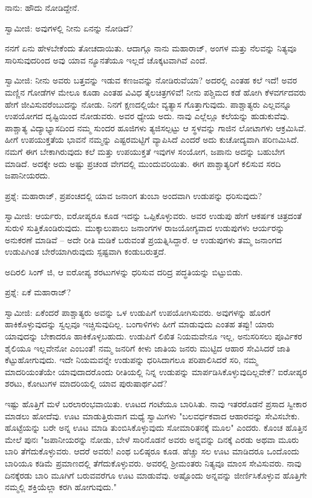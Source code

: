 ನಾನು: ಹೌದು ನೋಡಿದ್ದೇನೆ.

ಸ್ವಾಮೀಜಿ: ಅವುಗಳಲ್ಲಿ ನೀನು ಏನನ್ನು ನೋಡಿದೆ?

ನನಗೆ ಏನು ಹೇಳಬೇಕೆಂದು ತೋಚದಾಯಿತು. ಆದಾಗ್ಗೂ ನಾನು ಮಹಾರಾಜ್, ಅಂಗಳ ಮತ್ತು ನೆಲವನ್ನು ನಿತ್ಯವೂ ಸಾರಿಸುವುದರಿಂದ ಅವು ಯಾವ ನ್ಯೂನತೆಯೂ ಇಲ್ಲದೆ ಚೊಕ್ಕಟವಾಗಿವೆ ಎಂದೆ.

ಸ್ವಾಮೀಜಿ: ನೀನು ಅವರು ಬತ್ತವನ್ನು ಇಡುವ ಕಣಜವನ್ನು ನೋಡಿರುವೆಯಾ? ಅದರಲ್ಲಿ ಎಂತಹ ಕಲೆ ಇದೆ! ಅವರ ಮಣ್ಣಿನ ಗೋಡೆಗಳ ಮೇಲೂ ಕೂಡಾ ಎಂತಹ ವಿವಿಧ ತೈಲಚಿತ್ರಗಳಿವೆ! ನೀನು ಪಶ್ಚಿಮದ ಕಡೆ ಹೋಗಿ ಕೆಳವರ್ಗದವರು ಹೇಗೆ ಜೀವಿಸುವರೆಂಬುದನ್ನು ನೋಡು. ನಿನಗೆ ಕ್ಷಣದಲ್ಲಿಯೇ ವ್ಯತ್ಯಾಸ ಗೊತ್ತಾಗುವುದು. ಪಾಶ್ಚಾತ್ಯರು ಎಲ್ಲವನ್ನೂ ಉಪಯೋಗದ ದೃಷ್ಟಿಯಿಂದ ನೋಡುವರು. ಅವರ ಧ್ಯೇಯ ಅದು. ನಾವು ಎಲ್ಲೆಲ್ಲೂ ಕಲೆಯನ್ನು ಹುಡುಕುವೆವು. ಪಾಶ್ಚಾತ್ಯ ವಿದ್ಯಾಭ್ಯಾಸದಿಂದ ನಮ್ಮ ಸುಂದರ ಹೂಜಿಗಳು ತ್ಯಜಿಸಲ್ಪಟ್ಟು ಆ ಸ್ಥಳವನ್ನು ಗಾಜಿನ ಲೋಟಾಗಳು ಆಕ್ರಮಿಸಿವೆ. ಹೀಗೆ ಉಪಯುಕ್ತತೆಯ ಭಾವನೆ ನಮ್ಮನ್ನು ಎಷ್ಟರಮಟ್ಟಿಗೆ ವ್ಯಾಪಿಸಿದೆ ಎಂದರೆ ಅದು ಕುಚೋದ್ಯವಾಗಿ ಪರಿಣಮಿಸಿದೆ. ನಮಗೆ ಈಗ ಬೇಕಾಗಿರುವುದು ಕಲೆ ಮತ್ತು ಉಪಯುಕ್ತತೆ ಇವುಗಳ ಸಂಯೋಗ, ಜಪಾನು ಅದನ್ನು ಬಹುಬೇಗ ಮಾಡಿದೆ. ಅದಕ್ಕೇ ಅದು ಅಷ್ಟು ಪ್ರಚಂಡ ವೇಗದಲ್ಲಿ ಮುಂದುವರಿಯಿತು. ಈಗ ಪಾಶ್ಚಾತ್ಯರಿಗೆ ಕಲಿಸುವ ಸರದಿ ಜಪಾನೀಯರದು.

ಪ್ರಶ್ನೆ: ಮಹಾರಾಜ್, ಪ್ರಪಂಚದಲ್ಲಿ ಯಾವ ಜನಾಂಗ ತುಂಬಾ ಅಂದವಾಗಿ ಉಡುಪನ್ನು ಧರಿಸುವುದು?

ಸ್ವಾಮೀಜಿ: ಆರ್ಯರು, ಐರೋಪ್ಯರೂ ಕೂಡ ಇದನ್ನು ಒಪ್ಪಿಕೊಳ್ಳುವರು. ಅವರ ಉಡುಪು ಹೇಗೆ ಆಕರ್ಷಕ ಚಿತ್ರದಂತೆ ಸುರುಳಿ ಸುತ್ತಿಕೊಂಡಿರುವುದು. ಮುಕ್ಕಾಲುಪಾಲು ಜನಾಂಗಗಳ ರಾಜಯೋಗ್ಯವಾದ ಉಡುಪುಗಳು ಆರ್ಯರನ್ನು ಅನುಕರಣೆ ಮಾಡಿವೆ – ಅದೇ ರೀತಿ ಮಡಿಕೆ ಬರುವಂತೆ ಪ್ರಯತ್ನಿಸಿದ್ದಾರೆ. ಆ ಉಡುಪುಗಳು ತಮ್ಮ ಜನಾಂಗದ ಉಡುಪಿಗಿಂತ ಬೇರೆಯಾಗಿರುವುದು ಸ್ಪಷ್ಟವಾಗಿ ಕಂಡುಬರುತ್ತದೆ.

ಅದಿರಲಿ ಸಿಂಗ್ ಜಿ, ಆ ಐರೋಪ್ಯ ಶರಟುಗಳನ್ನು ಧರಿಸುವ ದರಿದ್ರ ಪದ್ಧತಿಯನ್ನು ಬಿಟ್ಟುಬಿಡು.

ಪ್ರಶ್ನೆ: ಏಕೆ ಮಹಾರಾಜ್?

ಸ್ವಾಮೀಜಿ: ಏಕೆಂದರೆ ಪಾಶ್ಚಾತ್ಯರು ಅವನ್ನು ಒಳ ಉಡುಪಿಗೆ ಉಪಯೋಗಿಸುವರು. ಅವುಗಳನ್ನು ಹೊರಗೆ ಹಾಕಿಕೊಳ್ಳುವುದನ್ನು ಸ್ವಲ್ಪವೂ ಇಚ್ಚಿಸುವುದಿಲ್ಲ. ಬಂಗಾಳಿಗಳು ಹೀಗೆ ಮಾಡುವುದು ಎಂತಹ ತಪ್ಪು! ಯಾರು ಯಾವುದನ್ನು ಬೇಕಾದರೂ ಹಾಕಿಕೊಳ್ಳಬಹುದು. ಉಡುಪಿಗೆ ಲಿಖಿತ ನಿಯಮವೇನೂ ಇಲ್ಲ, ಅನುಸರಿಸಲು ಪೂರ್ವಿಕರ ಶೈಲಿಯೂ ಇಲ್ಲವೇನೋ ಎಂಬಂತೆ! ನಮ್ಮ ಜನರಿಗೆ ಕೀಳು ಜಾತಿಯ ಜನರು ಮುಟ್ಟಿದ ಆಹಾರ ಸೇವಿಸಿದರೆ ಜಾತಿ ಕೆಟ್ಟುಹೋಗುವುದು. ಇದೇ ನಿಯಮವನ್ನೇ ಉಡುಪನ್ನು ಧರಿಸಿದಾಗಲೂ ಪರಿಪಾಲಿಸಿದರೆ ಸರಿ, ನಮ್ಮ ಮಾದರಿಯಂತೆಯೇ ಯಾವುದಾದರೊಂದು ರೀತಿಯಲ್ಲಿ ನಿನ್ನ ಉಡುಪನ್ನು ಮಾರ್ಪಡಿಸಿಕೊಳ್ಳುವುದಿಲ್ಲವೇಕೆ? ಐರೋಪ್ಯರ ಶರಟು, ಕೋಟುಗಳ ಮಾದರಿಯಲ್ಲಿ ಯಾವ ಪುರುಷಾರ್ಥವಿದೆ?

ಇಷ್ಟು ಹೊತ್ತಿಗೆ ಮಳೆ ಬರಲಾರಂಭವಾಯಿತು. ಊಟದ ಗಂಟೆಯೂ ಬಾರಿಸಿತು. ನಾವು ಇತರರೊಡನೆ ಪ್ರಸಾದ ಸ್ವೀಕಾರ ಮಾಡಲು ಹೋದೆವು. ಊಟ ಮಾಡುತ್ತಿರುವಾಗ ಮಧ್ಯೆ ಸ್ವಾಮಿಗಳು "ಬಲವರ್ಧಕವಾದ ಆಹಾರವನ್ನು ಸೇವಿಸಬೇಕು. ಹೊಟ್ಟೆಯನ್ನು ಬರೇ ಅನ್ನ ಊಟ ಮಾಡಿ ತುಂಬಿಸಿಕೊಳ್ಳುವುದು ಸೋಮಾರಿತನಕ್ಕೆ ಮೂಲ" ಎಂದರು. ಕೊಂಚ ಹೊತ್ತಿನ ಮೇಲೆ ಪುನಃ "ಜಪಾನೀಯರನ್ನು ನೋಡು, ಬೇಳೆ ಸಾರಿನೊಡನೆ ಅವರು ಅನ್ನವನ್ನು ದಿನಕ್ಕೆ ಎರಡು ಅಥವಾ ಮೂರು ಬಾರಿ ತೆಗೆದುಕೊಳ್ಳುವರು. ಆದರೆ ಅವರು! ಎಂಥ ಬಲಿಷ್ಠರೂ ಕೂಡ. ಹೆಚ್ಚು ಸಲ ಊಟ ಮಾಡಿದರೂ ಒಂದೊಂದು ಬಾರಿಯೂ ಕಡಿಮೆ ಪ್ರಮಾಣದಲ್ಲಿ ತೆಗೆದುಕೊಳ್ಳುವರು. ಅವರಲ್ಲಿ ಶ‍್ರೀಮಂತರು ನಿತ್ಯವೂ ಮಾಂಸ ಸೇವಿಸುವರು. ನಾವು ದಿನಕ್ಕೆರಡು ಬಾರಿ ಮೂಗಿಗೆ ಬರುವವರೆಗೂ ಊಟ ಮಾಡುವೆವು. ಅಷ್ಟೊಂದು ಅನ್ನವನ್ನು ಜೀರ್ಣಿಸಿಕೊಳ್ಳುವ ಹೊತ್ತಿಗೇ ನಮ್ಮಲ್ಲಿ ಶಕ್ತಿಯೆಲ್ಲಾ ಕರಗಿ ಹೋಗುವುದು."


